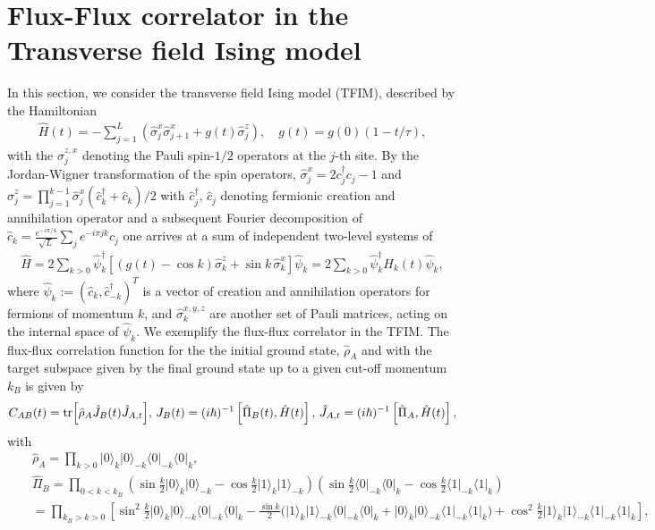 \documentclass[prl,aps,amssymb,twocolumn,superscriptaddress, notitlepage, longbibliography]{revtex4-2}
\begin{document}
\section{Flux-Flux correlator in the Transverse field Ising model}
In this section, we consider the transverse field Ising model (TFIM), described by the Hamiltonian~\cite{Zurek2005Dynamics,Dziarmaga2005Dynamics,Suzuki2012Quantum,Sachdev2011Quantum}
\begin{eqnarray}
    \hat{H}(t) = - \sum_{j=1}^L \left( \hat{\sigma}^x_j \hat{\sigma}^x_{j+1} + g(t) \hat{\sigma}_j^z \right),\quad g(t)=g(0)(1-t/\tau),
\end{eqnarray}
with the $\hat\sigma^{z,x}_j$ denoting the Pauli spin-$1/2$ operators at the $j$-th site.
By the Jordan-Wigner transformation of the spin operators, $\hat\sigma^x_j=2c^\dagger_jc_j-1$ and $\hat\sigma^z_j=\prod_{j=1}^{k-1}\hat\sigma^x_j(\hat c^\dagger_k+\hat c_k)/2$ with $\hat c^\dagger_j,\,\hat c_j$ denoting fermionic creation and annihilation operator and a subsequent Fourier decomposition of $\hat c_k=\frac{e^{-i\pi /4}}{\sqrt L}\sum_j e^{-i\pi jk}\hat c_j$ one arrives at a sum of independent two-level systems of
\begin{eqnarray}
    \hat{H} = 2 \sum_{k>0} \hat{\psi}_k^\dagger \left[ (g(t)-\cos k)\hat\sigma^z_k + \sin k \, \hat\sigma^x_k \right] \hat{\psi}_k
    = 2 \sum_{k>0} \hat{\psi}_k^\dagger H_k(t) \hat{\psi}_k,
\end{eqnarray}
where $\hat{\psi}_k := (\hat{c}_k, \hat{c}_{-k}^\dagger)^T$ is a vector of creation and annihilation operators for fermions of momentum $k$, and $\hat\sigma^{x,y,z}_k$ are another set of Pauli matrices, acting on the internal space of $\hat{\psi}_k$.
We exemplify the flux-flux correlator in the TFIM. The flux-flux correlation function for the the initial ground state, $\hat\rho_A$ and with the target subspace given by the final ground state up to a given cut-off momentum $k_B$ is given by
\begin{eqnarray}
    C_{AB}(t)=\tr[\hat\rho_A\hat J_B(t)\hat J_{A,t}],\,J_{B}(t)=(i\hbar)^{-1}\left[\hat\Pi_B(t),\hat H(t)\right],\,\hat J_{A,t}=(i\hbar)^{-1}\left[\hat\Pi_A,\hat H(t)\right],
\end{eqnarray}
with
\begin{eqnarray}
    &&\hat\rho_A=\prod_{k>0}\lvert 0\rangle_{k}\lvert 0\rangle_{-k}\langle 0\rvert_{-k}\langle 0\rvert_{k},\quad\\
    &&
    \hat\Pi_B=\prod_{0<k<k_B}\left(\sin\frac{k}{2}\lvert0\rangle_k\lvert0\rangle_{-k}-\cos\frac{k}{2}\lvert1\rangle_k\lvert1\rangle_{-k}\right)\left(\sin\frac{k}{2}\langle0\rvert_{-k}\langle0\rvert_k-\cos\frac{k}{2}\langle1\rvert_{-k}\langle1\rvert_k\right)\\
    &&=\prod_{k_B>k>0}\left[\sin^2\frac{k}{2}\lvert0\rangle_k\lvert0\rangle_{-k}\langle0\rvert_{-k}\langle0\rvert_k-\frac{\sin k}{2}\Big(\lvert1\rangle_k\lvert1\rangle_{-k}\langle0\rvert_{-k}\langle0\rvert_k+\lvert0\rangle_k\lvert0\rangle_{-k}\langle1\rvert_{-k}\langle1\rvert_k\Big)+\cos^2\frac{k}{2}\lvert1\rangle_k\lvert1\rangle_{-k}\langle1\rvert_{-k}\langle1\rvert_k\right],\nonumber
\end{eqnarray}
\end{document}
